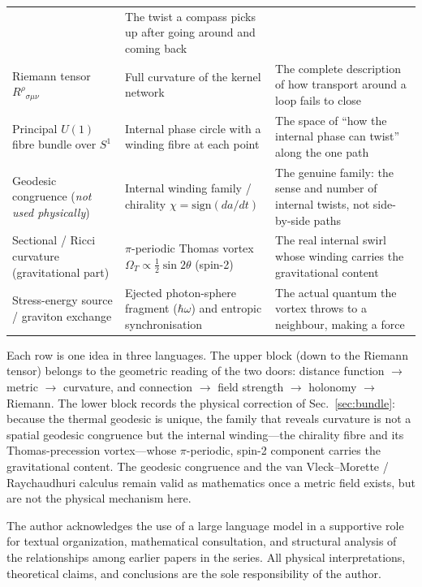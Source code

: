 \documentclass[%
 reprint, amsmath,amssymb, aps, prb, ]{revtex4-2}
\numberwithin{equation}{section}
\begin{document}
\begin{table}[t!]
\begin{tabular}{p{4.6cm}p{5.2cm}p{6.0cm}}
& The twist a compass picks up after going around and coming back \\
\addlinespace[0.2cm]
Riemann tensor $R^\rho{}_{\sigma\mu\nu}$
& Full curvature of the kernel network
& The complete description of how transport around a loop fails to close \\
\addlinespace[0.2cm]
Principal $U(1)$ fibre bundle over $S^1$
& Internal phase circle with a winding fibre at each point
& The space of ``how the internal phase can twist'' along the one path \\
\addlinespace[0.2cm]
Geodesic congruence (\emph{not used physically})
& Internal winding family / chirality $\chi=\mathrm{sign}(da/dt)$
& The genuine family: the sense and number of internal twists, not side-by-side paths \\
\addlinespace[0.2cm]
Sectional / Ricci curvature (gravitational part)
& $\pi$-periodic Thomas vortex $\Omega_T\propto\tfrac12\sin 2\theta$ (spin-2)
& The real internal swirl whose winding carries the gravitational content \\
\addlinespace[0.2cm]
Stress-energy source / graviton exchange
& Ejected photon-sphere fragment ($\hbar\omega$) and entropic synchronisation
& The actual quantum the vortex throws to a neighbour, making a force \\
\bottomrule
\end{tabular}
\vspace{0.2cm}
\begin{minipage}{0.95\textwidth}
\justifying\footnotesize
Each row is one idea in three languages. The upper block (down to the Riemann tensor) belongs to the geometric reading of the two doors: distance function $\to$ metric $\to$ curvature, and connection $\to$ field strength $\to$ holonomy $\to$ Riemann. The lower block records the physical correction of Sec.~\ref{sec:bundle}: because the thermal geodesic is unique, the family that reveals curvature is not a spatial geodesic congruence but the internal winding---the chirality fibre and its Thomas-precession vortex---whose $\pi$-periodic, spin-2 component carries the gravitational content. The geodesic congruence and the van Vleck--Morette / Raychaudhuri calculus remain valid as mathematics once a metric field exists, but are not the physical mechanism here.
\end{minipage}
\end{table}

\begin{acknowledgments}
The author acknowledges the use of a large language model in a supportive role for textual organization, mathematical consultation, and structural analysis of the relationships among earlier papers in the series. All physical interpretations, theoretical claims, and conclusions are the sole responsibility of the author.
\end{acknowledgments}
\end{document}

